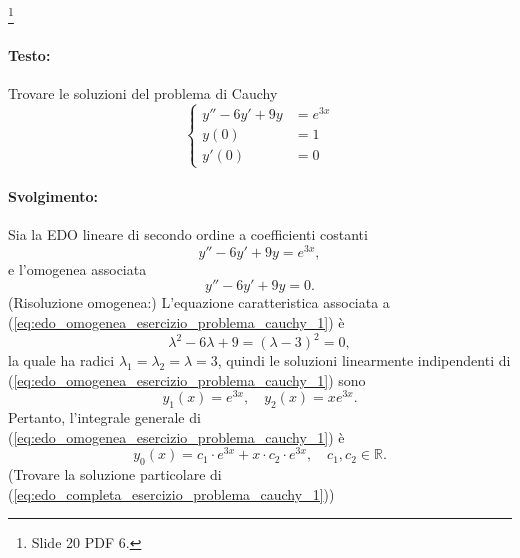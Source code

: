 \begin{example}\footnote{Slide 20 PDF 6.}
	\paragraph{Testo:} Trovare le soluzioni del problema di Cauchy
	\begin{equation*}
		\begin{cases}
			y'' - 6y' + 9 y &= e^{3x}\\
			y(0) &= 1\\
			y'(0) &=0
		\end{cases}
	\end{equation*}
	\paragraph{Svolgimento:} Sia la EDO lineare di secondo ordine a coefficienti costanti
	\begin{equation}\label{eq:edo_completa_esercizio_problema_cauchy_1}
		y'' - 6 y' + 9 y = e^{3x},
	\end{equation}
	e l'omogenea associata
	\begin{equation}\label{eq:edo_omogenea_esercizio_problema_cauchy_1}
		y'' - 6 y' + 9 y= 0.
	\end{equation}
	(Risoluzione omogenea:) L'equazione caratteristica associata a (\ref{eq:edo_omogenea_esercizio_problema_cauchy_1}) è
	\begin{equation*}
		\lambda^2 - 6\lambda + 9 = (\lambda -3)^2 = 0,
	\end{equation*}
	la quale ha radici $\lambda_1=\lambda_2=\lambda = 3$, quindi le soluzioni linearmente indipendenti di (\ref{eq:edo_omogenea_esercizio_problema_cauchy_1}) sono
	\begin{equation*}
		y_1(x) = e^{3x},\quad y_2(x) = xe^{3x}.
	\end{equation*}
	Pertanto, l'integrale generale di (\ref{eq:edo_omogenea_esercizio_problema_cauchy_1}) è
	\begin{equation*}
		y_0(x) = c_1 \cdot e^{3x} + x \cdot c_2 \cdot e^{3x},\quad c_1,c_2\in\mathbb{R}.
	\end{equation*}
	(Trovare la soluzione particolare di (\ref{eq:edo_completa_esercizio_problema_cauchy_1}))

\end{example}
